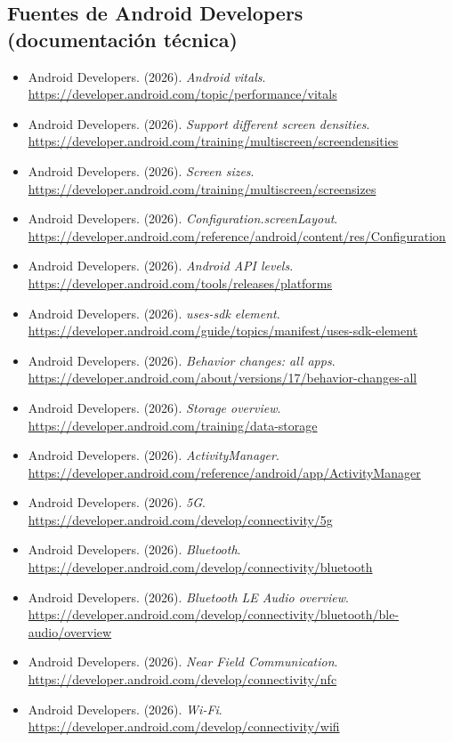 \documentclass[11pt,a4paper]{article}
\begin{document}
	\subsection*{Fuentes de Android Developers (documentación técnica)}
	{\footnotesize
		\begin{itemize}[leftmargin=*,itemsep=0.02em,topsep=0.1em,label={}]
			\item Android Developers. (2026). \emph{Android vitals}. \url{https://developer.android.com/topic/performance/vitals}
			\item Android Developers. (2026). \emph{Support different screen densities}. \url{https://developer.android.com/training/multiscreen/screendensities}
			\item Android Developers. (2026). \emph{Screen sizes}. \url{https://developer.android.com/training/multiscreen/screensizes}
			\item Android Developers. (2026). \emph{Configuration.screenLayout}. \url{https://developer.android.com/reference/android/content/res/Configuration}
			\item Android Developers. (2026). \emph{Android API levels}. \url{https://developer.android.com/tools/releases/platforms}
			\item Android Developers. (2026). \emph{uses-sdk element}. \url{https://developer.android.com/guide/topics/manifest/uses-sdk-element}
			\item Android Developers. (2026). \emph{Behavior changes: all apps}. \url{https://developer.android.com/about/versions/17/behavior-changes-all}
			\item Android Developers. (2026). \emph{Storage overview}. \url{https://developer.android.com/training/data-storage}
			\item Android Developers. (2026). \emph{ActivityManager}. \url{https://developer.android.com/reference/android/app/ActivityManager}
			\item Android Developers. (2026). \emph{5G}. \url{https://developer.android.com/develop/connectivity/5g}
			\item Android Developers. (2026). \emph{Bluetooth}. \url{https://developer.android.com/develop/connectivity/bluetooth}
			\item Android Developers. (2026). \emph{Bluetooth LE Audio overview}. \url{https://developer.android.com/develop/connectivity/bluetooth/ble-audio/overview}
			\item Android Developers. (2026). \emph{Near Field Communication}. \url{https://developer.android.com/develop/connectivity/nfc}
			\item Android Developers. (2026). \emph{Wi-Fi}. \url{https://developer.android.com/develop/connectivity/wifi}
		\end{itemize}
	}
	
\end{document}
